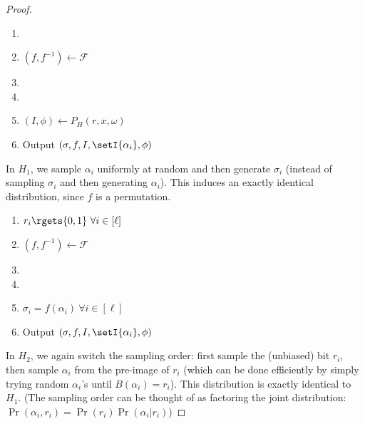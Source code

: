 \documentclass[12pt]{tufte-book}
\newcommand{\bit}{\{0,1\}}
\begin{document}
\begin{proof}
\begin{enumerate}
    \item \diff{$r_i \gets \bit ~\forall i \in [\ell]$}
    \item $(f, f^{-1}) \gets \mathcal{F}$
    \item {}
    \item {}
    \item $(I, \phi) \gets P_H(r, x, \omega)$
    \item Output $(\sigma, f, I, \setI{\alpha_i}, \phi)$
\end{enumerate}
In $H_1$, we sample $\alpha_i$ uniformly at random and then generate $\sigma_i$ (instead of
sampling $\sigma_i$ and then generating $\alpha_i$). This induces an exactly identical distribution, since $f$
is a permutation.

\begin{enumerate}
    \item $r_i \rgets \{0, 1\} ~\forall i \in [\ell]$
    \item $(f, f^{-1}) \gets \mathcal{F}$
    \item {}
    \item {}
    \item $\sigma_i = f(\alpha_i) ~\forall i \in [\ell]$
    \item Output $(\sigma, f, I, \setI{\alpha_i}, \phi)$
\end{enumerate}
In $H_2$, we again switch the sampling order: first sample the (unbiased) bit
$r_i$, then sample $\alpha_i$ from the pre-image of $r_i$ (which can be done efficiently
by simply trying random $\alpha_i$'s until $B(\alpha_i) = r_i$).
This distribution is exactly identical to $H_1$.
(The sampling order can be thought of as factoring the joint distribution:
$\Pr(\alpha_i, r_i) = \Pr(r_i)\Pr(\alpha_i | r_i)$)


\end{proof}
\end{document}
